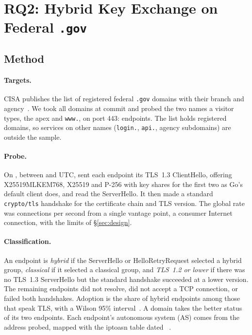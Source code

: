 \section{RQ2: Hybrid Key Exchange on Federal \texttt{.gov}}
\label{sec:rq2}

\subsection{Method}

\paragraph{Targets.} CISA publishes the list of registered federal
\texttt{.gov} domains with their branch and agency~\cite{dotgovdata}. We took
all  domains at commit \texttt{}
and probed the two names a visitor types, the apex and \texttt{www.}, on port
443:  endpoints. The list holds registered domains, so
services on other names (\texttt{login.}, \texttt{api.}, agency subdomains)
are outside the sample.

\paragraph{Probe.} On , between  and
 UTC, \tool{} sent each endpoint its TLS~1.3 ClientHello,
offering X25519MLKEM768, X25519 and P-256 with key shares for the first two as
Go's default client does, and read the ServerHello. It then made a
standard \texttt{crypto/tls} handshake for the certificate chain and TLS
version. The global rate was  connections per second from a
single vantage point, a consumer Internet connection, with the limits of
\S\ref{sec:design}.

\paragraph{Classification.} An endpoint is \emph{hybrid} if the ServerHello
or HelloRetryRequest selected a hybrid group, \emph{classical} if it selected a
classical group, and \emph{TLS~1.2 or lower} if there was no TLS~1.3
ServerHello but the standard handshake succeeded at a lower version. The
remaining endpoints did not resolve, did not accept a TCP connection, or
failed both handshakes. Adoption is the share of hybrid endpoints among those
that speak TLS, with a Wilson 95\% interval~\cite{wilson1927}. A domain takes
the better status of its two endpoints. Each endpoint's autonomous system (AS)
comes from the address probed, mapped with the iptoasn table dated
~\cite{iptoasn}.

